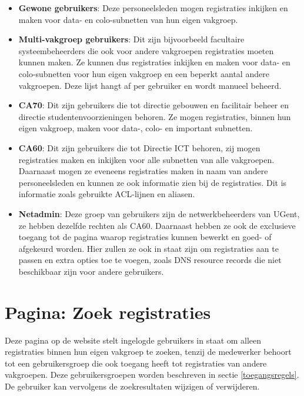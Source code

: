 \begin{itemize}
    \item \textbf{Gewone gebruikers}: Deze personeelsleden mogen registraties inkijken en maken voor data- en colo-subnetten van hun eigen vakgroep.
    \item \textbf{Multi-vakgroep gebruikers}: Dit zijn bijvoorbeeld facultaire systeembeheerders die ook voor andere vakgroepen registraties moeten kunnen maken. Ze kunnen dus registraties inkijken en maken voor data- en colo-subnetten voor hun eigen vakgroep en een beperkt aantal andere vakgroepen. Deze lijst hangt af per gebruiker en wordt manueel beheerd.
    \item \textbf{CA70}: Dit zijn gebruikers die tot directie gebouwen en facilitair beheer en directie studentenvoorzieningen behoren. Ze mogen registraties, binnen hun eigen vakgroep, maken voor data-, colo- en important subnetten.
    \item \textbf{CA60}: Dit zijn gebruikers die tot Directie ICT behoren, zij mogen registraties maken en inkijken voor alle subnetten van alle vakgroepen. Daarnaast mogen ze eveneens registraties maken in naam van andere personeelsleden en kunnen ze ook informatie zien bij de registraties. Dit is informatie zoals gebruikte ACL-lijnen en aliasen.
    \item \textbf{Netadmin}: Deze groep van gebruikers zijn de netwerkbeheerders van UGent, ze hebben dezelfde rechten als CA60. Daarnaast hebben ze ook de exclusieve toegang tot de pagina waarop registraties kunnen bewerkt en goed- of afgekeurd worden. Hier zullen ze ook in staat zijn om registraties aan te passen en extra opties toe te voegen, zoals DNS resource records die niet beschikbaar zijn voor andere gebruikers.
\end{itemize}

\section{Pagina: Zoek registraties}
\label{zoek-registraties}
Deze pagina op de website stelt ingelogde gebruikers in staat om alleen registraties binnen hun eigen vakgroep te zoeken, tenzij de medewerker behoort tot een gebruikersgroep die ook toegang heeft tot registraties van andere vakgroepen. Deze gebruikersgroepen worden beschreven in sectie \ref{toegangsregels}. De gebruiker kan vervolgens de zoekresultaten wijzigen of verwijderen.
